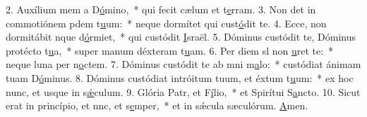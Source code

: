 2. Auxílium mem a D\uline{ó}mino,~* qui fecit cælum et t\uline{e}rram.
3. Non det in commotiónem pdem t\uline{u}um:~* neque dormítet qui cust\uline{ó}dit te.
4. Ecce, non dormitábit nque d\uline{ó}rmiet,~* qui custódit \uline{I}sraël.
5. Dóminus custódit te, Dóminus protécto t\uline{u}a,~* super manum déxteram t\uline{u}am.
6. Per diem sl non \uline{u}ret te:~* neque luna per n\uline{o}ctem.
7. Dóminus custódit te ab mni m\uline{a}lo:~* custódiat ánimam tuam D\uline{ó}minus.
8. Dóminus custódiat intróitum tuum, et éxtum t\uline{u}um:~* ex hoc nunc, et usque in s\uline{ǽ}culum.
9. Glória Patr, et F\uline{í}lio,~* et Spirítui S\uline{a}ncto.
10. Sicut erat in princípio, et nnc, et s\uline{e}mper,~* et in sǽcula sæculórum. \uline{A}men.
